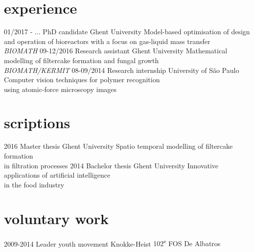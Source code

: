 \documentclass[]{friggeri-cv}
\begin{document}
\section{experience}
\begin{entrylist}
  \entry
    {01/2017 - ...}
    {PhD candidate}
    {Ghent University}
    {Model-based optimisation of design and operation of bioreactors with a focus on gas-liquid mass transfer \\ \textit{BIOMATH}}
    \entry
    {09-12/2016}
    {Research assistant}
    {Ghent University}
    {Mathematical modelling of filtercake formation and fungal growth \\{\textit{BIOMATH/KERMIT}}}
    \entry
    {08-09/2014}
    {Research internship}
    {University of S\~{a}o Paulo}
    {Computer vision techniques for polymer recognition\\ using atomic-force microscopy images}
\end{entrylist}

\section{scriptions}
\begin{entrylist}
  \entry
    {2016}
    {Master thesis}
    {Ghent University}
    {Spatio temporal modelling of filtercake formation\\ in filtration processes}
  \entry
    {2014}
    {Bachelor thesis}
    {Ghent University}
    {Innovative applications of artificial intelligence\\ in the food industry}
\end{entrylist}

\section{voluntary work}
\begin{entrylist}
 \entry
    {2009-2014}
    {Leader youth movement}
    {Knokke-Heist}
    {102\textsuperscript{e} FOS De Albatros}
\end{entrylist} \vspace{1.5cm}
\end{document}

